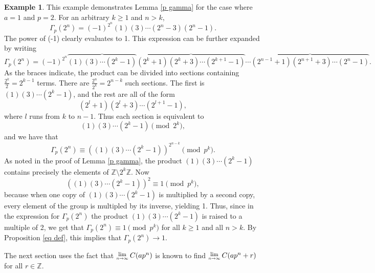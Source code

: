 \documentclass[12pt, letter]{article}    %
\theoremstyle{plain}
\theoremstyle{definition}
\newtheorem{example}[theorem]{Example}
\numberwithin{equation}{section}
\newcommand{\Lim}[1]{\raisebox{0.5ex}{\scalebox{0.8}{$\displaystyle \lim_{#1}\;$}}}
\newcommand{\thref}[1]{Theorem \ref{#1}}
\newcommand{\lemref}[1]{Lemma \ref{#1}}
\newcommand{\propref}[1]{Proposition \ref{#1}}
\begin{document}
\begin{example} This example demonstrates \lemref{p gamma} for the case where $a=1$ and $p=2$. For an arbitrary $k\geq1$ and $n>k$, 
$$\Gamma_p(2^n)=(-1)^{2^n}(1)(3)\cdots(2^n-3)(2^n-1).$$ The power of (-1) clearly evaluates to 1. This expression can be further expanded by writing
$$\Gamma_p(2^n)=(-1)^{2^n}\overbrace{(1)(3)\cdots(2^k-1)}\overbrace{(2^k+1)(2^k+3)\cdots(2^{k+1}-1)}\cdots\overbrace{(2^{n-1}+1)(2^{n+1}+3)\cdots(2^n-1)}.$$ As the braces indicate, the product can be divided into sections containing $\frac{2^k}{2}=2^{k-1}$ terms. There are $\frac{2^n}{2^k}=2^{n-k}$ such sections. The first is $(1)(3)\cdots(2^k-1)$, and the rest are all of the form $$(2^l+1)(2^l+3)\cdots(2^{l+1}-1),$$ where $l$ runs from $k$ to $n-1$. Thus each section is equivalent to $$(1)(3)\cdots(2^k-1)\pmod{2^k},$$ and we have that $$\Gamma_p(2^n)\equiv\left((1)(3)\cdots(2^k-1)\right)^{2^{n-k}}\pmod{p^k}.$$ As noted in the proof of \lemref{p gamma}, the product $(1)(3)\cdots(2^k-1)$ contains precisely the elements of $\mathbb{Z}\setminus 2^k\mathbb{Z}$. Now $$\left((1)(3)\cdots(2^k-1)\right)^2\equiv 1\pmod{p^k},$$ because when one copy of $(1)(3)\cdots(2^k-1)$ is multiplied by a second copy, every element of the group is multipled by its inverse, yielding 1. Thus, since in the expression for $\Gamma_p(2^n)$ the product $(1)(3)\cdots(2^k-1)$ is raised to a multiple of 2, we get that $\Gamma_p(2^n)\equiv 1\pmod{p^k}$ for all $k\geq1$ and all $n>k$. By \propref{eq def}, this implies that $\Gamma_p(2^n)\rightarrow 1.$
\end{example}

The next section uses the fact that $\Lim{n\rightarrow\infty}C(ap^n)$ is known to find $\Lim{n\rightarrow\infty}C(ap^n+r)$ for all $r\in\mathbb{Z}$.



\end{document}
